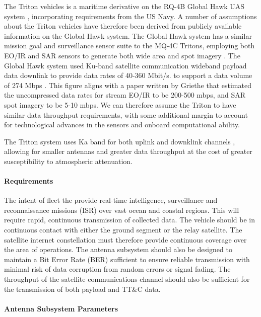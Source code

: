 \documentclass[12pt]{article}
\begin{document}
The Triton vehicles is a maritime derivative on the RQ-4B Global Hawk UAS system \cite{navyrecognition}, incorporating requirements from the US Navy. A number of assumptions about the Triton vehicles have therefore been derived from publicly available information on the Global Hawk system. The Global Hawk system has a similar mission goal and surveillance sensor suite to the MQ-4C Tritons, employing both EO/IR and SAR sensors to generate both wide area and spot imagery \cite{10.2307/resrep13763.8}. The Global Hawk system used Ku-band satellite communication wideband payload data downlink  to provide data rates of 40-360 Mbit/s. \cite{eoportal} to support a data volume of 274 Mbps \cite{griethe}. This figure aligns with a paper written by Griethe that estimated the uncompressed data rates for stream EO/IR to be 200-500 mbps, and SAR spot imagery to be 5-10 mbps. We can therefore assume the Triton to have similar data throughput requirements, with some additional margin to account for technological advances in the sensors and onboard computational ability\cite{griethe}.  

The Triton system uses Ka band for both uplink and downklink channels \cite{thinkom}, allowing for smaller antennas and greater data throughput at the cost of greater susceptibility to atmospheric attenuation. 


\paragraph{Requirements}

The intent of fleet the provide real-time intelligence, surveillance and reconnaissance missions (ISR) over vast ocean and coastal regions. This will require rapid, continuous transmission of collected data. The vehicle should be in continuous contact with either the ground segment or the relay satellite. The satellite internet constellation must therefore provide continuous coverage over the area of operations. The antenna subsystem should also be designed to maintain a Bit Error Rate (BER) sufficient to ensure reliable transmission with minimal risk of data corruption from random errors or signal fading. The throughput of the satellite communications channel should also be sufficient for the transmission of both payload and TT\&C data. 

\paragraph{Antenna Subsystem Parameters}
\end{document}
